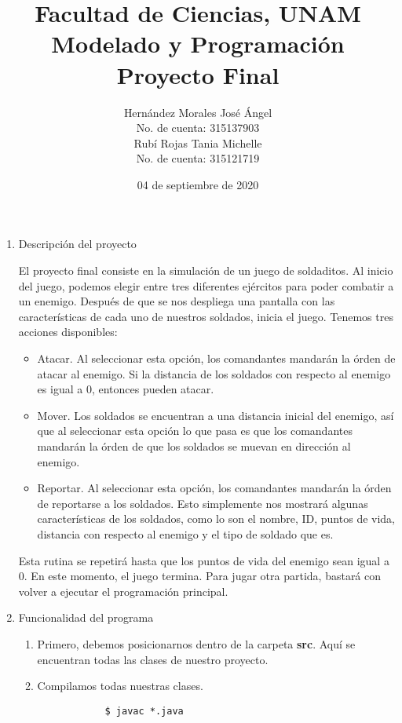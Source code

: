 \documentclass[letterpaper,11pt]{article}
\title{Facultad de Ciencias, UNAM \\ Modelado y Programación \\ Proyecto Final}
\author{Hernández Morales José Ángel \\ No. de cuenta: 315137903 \\ 
        Rubí Rojas Tania Michelle \\ No. de cuenta: 315121719}
\date{04 de septiembre de 2020}
\begin{document}
\maketitle

\begin{enumerate}
    \item Descripción del proyecto

    El proyecto final consiste en la simulación de un juego de soldaditos. Al 
    inicio del juego, podemos elegir entre tres diferentes ejércitos para poder 
    combatir a un enemigo. Después de que se nos despliega una pantalla con las 
    características de cada uno de nuestros soldados, inicia el juego. Tenemos 
    tres acciones disponibles:
    \begin{itemize}
        \item Atacar. Al seleccionar esta opción, los comandantes mandarán la 
        órden de atacar al enemigo. Si la distancia de los soldados con respecto 
        al enemigo es igual a $0$, entonces pueden atacar.

        \item Mover. Los soldados se encuentran a una distancia inicial del 
        enemigo, así que al seleccionar esta opción lo que pasa es que los 
        comandantes mandarán la órden de que los soldados se muevan en dirección 
        al enemigo.

        \item Reportar. Al seleccionar esta opción, los comandantes mandarán la 
        órden de reportarse a los soldados. Esto simplemente nos mostrará algunas 
        características de los soldados, como lo son el nombre, ID, puntos de vida,
        distancia con respecto al enemigo y el tipo de soldado que es.
    \end{itemize}

    Esta rutina se repetirá hasta que los puntos de vida del enemigo sean igual 
    a $0$. En este momento, el juego termina. Para jugar otra partida, bastará 
    con volver a ejecutar el programación principal.

    \item Funcionalidad del programa
    \begin{enumerate}
        \item Primero, debemos posicionarnos dentro de la carpeta \textbf{src}.
        Aquí se encuentran todas las clases de nuestro proyecto.

        \item Compilamos todas nuestras clases.
        \begin{verbatim}
            $ javac *.java
        \end{verbatim}


\end{enumerate}
\end{enumerate}
\end{document}
